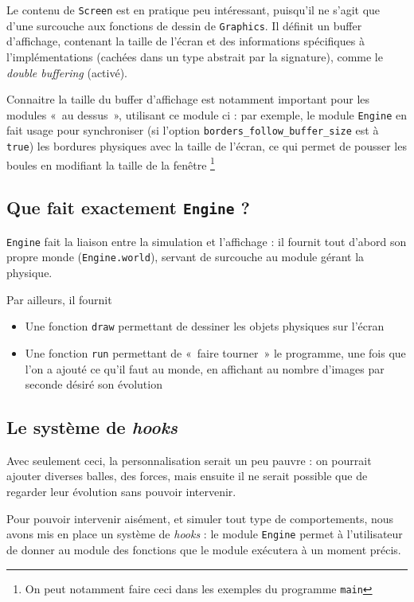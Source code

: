 \documentclass[a4paper]{scrartcl}
\begin{document}
Le contenu de \texttt{Screen} est en pratique peu intéressant,
puisqu'il ne s'agit que d'une surcouche aux fonctions de dessin de
\texttt{Graphics}. Il définit un buffer d'affichage, contenant la
taille de l'écran et des informations spécifiques à l'implémentations
(cachées dans un type abstrait par la signature), comme le
\emph{double buffering} (activé).

Connaitre la taille du buffer d'affichage est notamment important pour
les modules «~au dessus~», utilisant ce module ci : par exemple, le
module \texttt{Engine} en fait usage pour synchroniser (si l'option
\texttt{borders\_follow\_buffer\_size} est à \texttt{true}) les bordures
physiques avec la taille de l'écran, ce qui permet de pousser les
boules en modifiant la taille de la fenêtre \footnote{On peut
  notamment faire ceci dans les exemples du programme \texttt{main}}

\subsection{Que fait exactement \texttt{Engine} ?}
\texttt{Engine} fait la liaison entre la simulation et l'affichage :
il fournit tout d'abord son propre monde (\texttt{Engine.world}),
servant de surcouche au module gérant la physique.

Par ailleurs, il fournit 
\begin{itemize}
\item Une fonction \texttt{draw} permettant de dessiner les objets
  physiques sur l'écran
\item Une fonction \texttt{run} permettant de «~faire tourner~» le
  programme, une fois que l'on a ajouté ce qu'il faut au monde, en
  affichant au nombre d'images par seconde désiré son évolution
\end{itemize}

\subsection{Le système de \emph{hooks}}
Avec seulement ceci, la personnalisation serait un peu pauvre : on
pourrait ajouter diverses balles, des forces, mais ensuite il ne
serait possible que de regarder leur évolution sans pouvoir
intervenir.

Pour pouvoir intervenir aisément, et simuler tout type de
comportements, nous avons mis en place un système de \emph{hooks} : le
module \texttt{Engine} permet à l'utilisateur de donner au module des
fonctions que le module exécutera à un moment précis.
\end{document}

